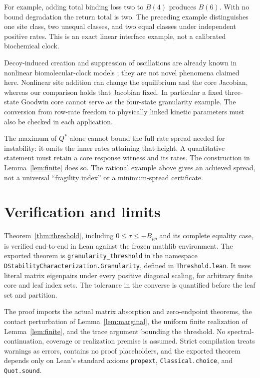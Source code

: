 \documentclass[11pt]{article}
\theoremstyle{remark}\newtheorem{remark}[theorem]{Remark}
\begin{document}
For example, adding total binding loss two to $B(4)$ produces $B(6)$.
With no bound degradation the return total is two. The preceding example
distinguishes one site class, two unequal classes, and two equal classes
under independent positive rates. This is an exact linear interface
example, not a calibrated biochemical clock.

Decoy-induced creation and suppression of oscillations are already known
in nonlinear biomolecular-clock models \cite{dey,karapetyan}; they are not
novel phenomena claimed here. Nonlinear site addition can change the
equilibrium and the core Jacobian, whereas our comparison holds that
Jacobian fixed. In particular a fixed three-state Goodwin core cannot
serve as the four-state granularity example. The conversion from row-rate
freedom to physically linked kinetic parameters must also be checked in
each application.

The maximum of $Q^*$ alone cannot bound the full rate spread needed for
instability: it omits the inner rates attaining that height. A quantitative
statement must retain a core response witness and its rates. The construction
in Lemma~\ref{lem:finite} does so. The rational example above gives an
achieved spread, not a universal ``fragility index'' or a minimum-spread
certificate.

\section{Verification and limits}\label{sec:formal}
Theorem~\ref{thm:threshold}, including $0\le\tau\le-B_{pp}$ and its complete
equality case, is verified end-to-end in Lean against the frozen mathlib
environment. The exported theorem is \texttt{granularity\_threshold} in
the namespace \texttt{DStabilityCharacterization.Granularity}, defined in
\texttt{Threshold.lean}. It uses literal matrix eigenpairs under every
positive diagonal scaling, for arbitrary finite core and leaf index sets.
The tolerance in the converse is quantified before the leaf set and partition.

The proof imports the actual matrix absorption and zero-endpoint theorems,
the contact perturbation of Lemma~\ref{lem:marginal}, the uniform finite
realization of Lemma~\ref{lem:finite}, and the trace argument bounding the
threshold. No spectral-continuation, coverage or realization premise is
assumed. Strict compilation treats warnings as errors, contains no proof
placeholders, and the exported theorem depends only on Lean's standard
axioms \texttt{propext}, \texttt{Classical.choice}, and \texttt{Quot.sound}.
\end{document}
